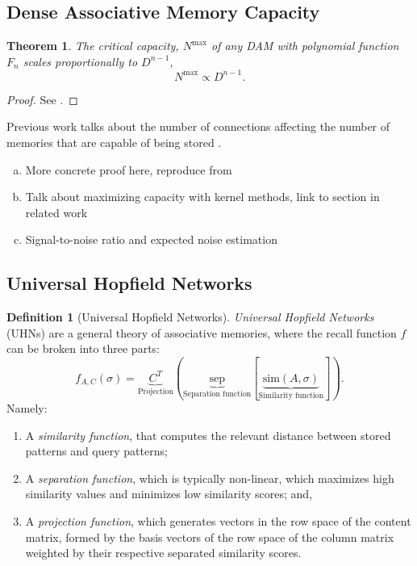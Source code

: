\documentclass{article}
\newtheorem{theorem}{Theorem}[subsection]
\theoremstyle{definition}
\newtheorem{definition}{Definition}[subsection]
\begin{document}
\subsection{Dense Associative Memory Capacity}\label{sec:dam-cap}

\begin{theorem}
  The critical capacity, $N^\text{max}$ of any DAM with polynomial
  function $F_n$ scales proportionally to $D^{n-1}$,
  $$
  N^\text{max} \propto D^{n-1}.
  $$
\end{theorem}

\begin{proof}
  See \textcites{demircigil_model_2017,krotov_dense_2016}.
\end{proof}

Previous work talks about the number of connections affecting the number of
memories that are capable of being stored \parencite{little_analytic_1978}.

\begin{enumerate}[(a)]
  \item More concrete proof here, reproduce from
    \parencites{krotov_dense_2016,demircigil_model_2017}
  \item Talk about maximizing capacity with kernel methods, link to
    section in related work
  \item Signal-to-noise ratio and expected noise estimation
\end{enumerate}

\subsection{Universal Hopfield Networks}\label{sec:uhn}

\begin{definition}[Universal Hopfield Networks]
  \textit{Universal Hopfield Networks} (UHNs) are a general theory
  of associative memories, where the recall function $f$ can be broken into
  three parts:
  $$
  f_{A,C}(\sigma) = \underbrace{C^T}_{\text{Projection}} \left(
    \underbrace{\text{sep}}_{\text{Separation function}}
    \left[ \underbrace{\text{sim}(A, \sigma)}_{\text{Similarity
  function}} \right] \right).
  $$
  Namely:
  \begin{enumerate}[(1)]
    \item A \textit{similarity function}, that computes the relevant
      distance between stored
      patterns and query patterns;
    \item A \textit{separation function}, which is typically
      non-linear, which maximizes
      high similarity values and minimizes low similarity scores; and,
    \item A \textit{projection function}, which generates vectors in the row
      space of the content matrix, formed by the basis vectors of the
      row space of the
      column matrix weighted by their respective separated similarity scores.
  \end{enumerate}
\end{definition}
\end{document}
